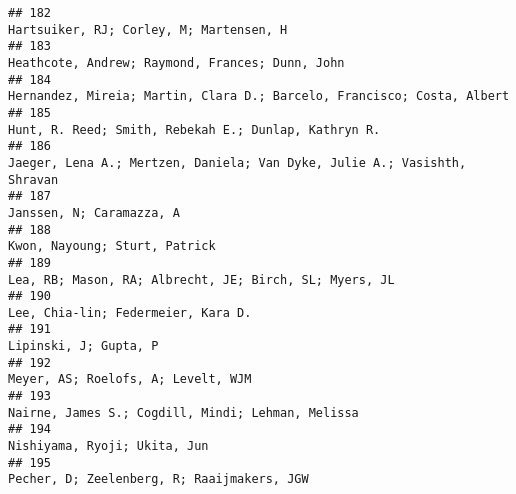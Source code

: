 \documentclass[
  english,
  man]{apa6}
\begin{document}
\begin{verbatim}
## 182                                                                                                                                                  Hartsuiker, RJ; Corley, M; Martensen, H
## 183                                                                                                                                          Heathcote, Andrew; Raymond, Frances; Dunn, John
## 184                                                                                                                   Hernandez, Mireia; Martin, Clara D.; Barcelo, Francisco; Costa, Albert
## 185                                                                                                                                     Hunt, R. Reed; Smith, Rebekah E.; Dunlap, Kathryn R.
## 186                                                                                                                 Jaeger, Lena A.; Mertzen, Daniela; Van Dyke, Julie A.; Vasishth, Shravan
## 187                                                                                                                                                                 Janssen, N; Caramazza, A
## 188                                                                                                                                                            Kwon, Nayoung; Sturt, Patrick
## 189                                                                                                                                   Lea, RB; Mason, RA; Albrecht, JE; Birch, SL; Myers, JL
## 190                                                                                                                                                       Lee, Chia-lin; Federmeier, Kara D.
## 191                                                                                                                                                                    Lipinski, J; Gupta, P
## 192                                                                                                                                                       Meyer, AS; Roelofs, A; Levelt, WJM
## 193                                                                                                                                        Nairne, James S.; Cogdill, Mindi; Lehman, Melissa
## 194                                                                                                                                                             Nishiyama, Ryoji; Ukita, Jun
## 195                                                                                                                                               Pecher, D; Zeelenberg, R; Raaijmakers, JGW

\end{verbatim}
\end{document}
